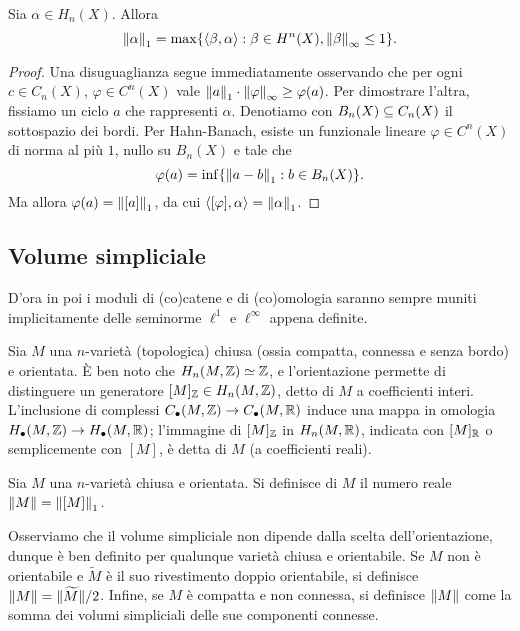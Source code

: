 \begin{proposition}
Sia $\alpha\in H_n(X)$. Allora
\[
\left\lVert \alpha\right\rVert_1=\max\{\langle\beta,\alpha\rangle:\beta\in H^n(X),\left\lVert \beta\right\rVert_\infty\le 1\}.
\]
\end{proposition}
\begin{proof}
Una disuguaglianza segue immediatamente osservando che per ogni $c\in C_n(X)$, $\varphi\in C^n(X)$ vale $\left\lVert a\right\rVert_1\cdot\left\lVert \varphi\right\rVert_\infty\ge\varphi(a)$. Per dimostrare l'altra, fissiamo un ciclo $a$ che rappresenti $\alpha$. Denotiamo con $B_n(X)\subseteq C_n(X)$ il sottospazio dei bordi. Per Hahn-Banach, esiste un funzionale lineare $\varphi\in C^n(X)$ di norma al più $1$, nullo su $B_n(X)$ e tale che
\[
\varphi(a)=\inf\{\left\lVert a-b\right\rVert_1:b\in B_n(X)\}.
\]
Ma allora $\varphi(a)=\left\lVert [a]\right\rVert_1$, da cui $\langle[\varphi],\alpha\rangle=\left\lVert \alpha\right\rVert_1$.
\end{proof}

\subsection{Volume simpliciale}
D'ora in poi i moduli di (co)catene e di (co)omologia saranno sempre muniti implicitamente delle seminorme $\ell^1$ e $\ell^\infty$ appena definite.

Sia $M$ una $n$-varietà (topologica) chiusa (ossia compatta, connessa e senza bordo) e orientata. È ben noto che $H_n(M,\mathbb{Z})\simeq\mathbb{Z}$, e l'orientazione permette di distinguere un generatore $[M]_{\mathbb{Z}}\in H_n(M,\mathbb{Z})$, detto  di $M$ a coefficienti interi. L'inclusione di complessi $C_\bullet(M,\mathbb{Z})\to C_\bullet(M,\mathbb{R})$ induce una mappa in omologia $H_\bullet(M,\mathbb{Z})\to H_\bullet(M,\mathbb{R})$; l'immagine di $[M]_{\mathbb{Z}}$ in $H_n(M,\mathbb{R})$, indicata con $[M]_{\mathbb{R}}$ o semplicemente con $[M]$, è detta  di $M$ (a coefficienti reali).

\begin{definition}
Sia $M$ una $n$-varietà chiusa e orientata. Si definisce  di $M$ il numero reale $\left\lVert M\right\rVert=\left\lVert [M]\right\rVert_1$.
\end{definition}
Osserviamo che il volume simpliciale non dipende dalla scelta dell'orientazione, dunque è ben definito per qualunque varietà chiusa e orientabile. Se $M$ non è orientabile e $\widetilde M$ è il suo rivestimento doppio orientabile, si definisce $\left\lVert M\right\rVert=\lVert\widetilde M\rVert/2$. Infine, se $M$ è compatta e non connessa, si definisce $\left\lVert M\right\rVert$ come la somma dei volumi simpliciali delle sue componenti connesse.


